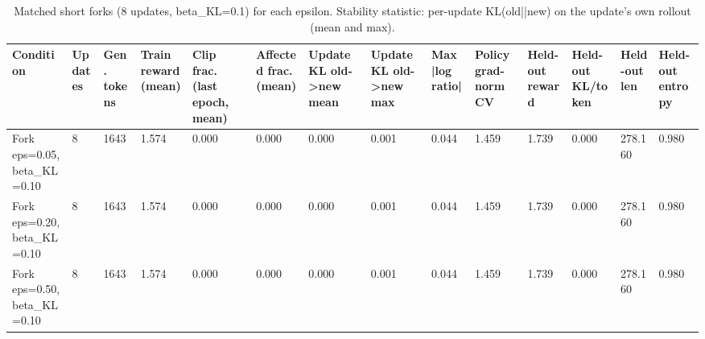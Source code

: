 \begin{table}[t]
\centering
\small
\caption{Matched short forks (8 updates, beta\_KL=0.1) for each epsilon. Stability statistic: per-update KL(old||new) on the update's own rollout (mean and max).}
\begin{tabular}{llllllllllllll}
\toprule
Condition & Updates & Gen. tokens & Train reward (mean) & Clip frac. (last epoch, mean) & Affected frac. (mean) & Update KL old->new mean & Update KL old->new max & Max |log ratio| & Policy grad-norm CV & Held-out reward & Held-out KL/token & Held-out len & Held-out entropy \\
\midrule
Fork eps=0.05, beta\_KL=0.10 & 8 & 1643 & 1.574 & 0.000 & 0.000 & 0.000 & 0.001 & 0.044 & 1.459 & 1.739 & 0.000 & 278.160 & 0.980 \\
Fork eps=0.20, beta\_KL=0.10 & 8 & 1643 & 1.574 & 0.000 & 0.000 & 0.000 & 0.001 & 0.044 & 1.459 & 1.739 & 0.000 & 278.160 & 0.980 \\
Fork eps=0.50, beta\_KL=0.10 & 8 & 1643 & 1.574 & 0.000 & 0.000 & 0.000 & 0.001 & 0.044 & 1.459 & 1.739 & 0.000 & 278.160 & 0.980 \\
\bottomrule
\end{tabular}
\end{table}
